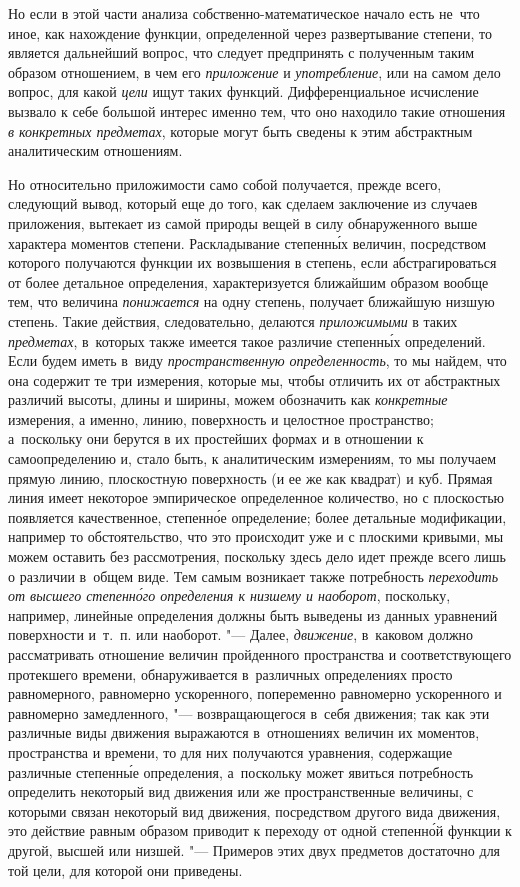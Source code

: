 Но если в этой части анализа собственно-математическое начало есть не~что иное,
как нахождение функции, определенной через развертывание степени, то является
дальнейший вопрос, что следует предпринять с полученным таким образом
отношением, в чем его {\em приложение} и {\em употребление}, или на самом дело
вопрос, для какой {\em цели} ищут таких функций. Дифференциальное исчисление
вызвало к себе большой интерес именно тем, что оно находило такие отношения
{\em в конкретных предметах}, которые могут быть сведены к этим абстрактным
аналитическим отношениям.

Но относительно приложимости само собой получается, прежде всего, следующий
вывод, который еще до того, как сделаем заключение из случаев приложения,
вытекает из самой природы вещей в силу обнаруженного выше характера моментов
степени. Раскладывание степенн\'{ы}х величин, посредством которого получаются
функции их возвышения в степень, если абстрагироваться от более детальное
определения, характеризуется ближайшим образом вообще тем, что величина
{\em понижается} на одну степень, получает ближайшую низшую степень. Такие
действия, следовательно, делаются {\em приложимыми} в таких {\em предметах},
в~которых также имеется такое различие степенн\'{ы}х определений. Если будем
иметь в~виду {\em пространственную определенность}, то мы найдем, что она
содержит те три измерения, которые мы, чтобы отличить их от абстрактных
различий высоты, длины и ширины, можем обозначить как {\em конкретные}
измерения, а именно, линию, поверхность и целостное пространство; а~поскольку
они берутся в их простейших формах и в отношении к самоопределению и, стало
быть, к аналитическим измерениям, то мы получаем прямую линию, плоскостную
поверхность (и ее же как квадрат) и куб. Прямая линия имеет некоторое
эмпирическое определенное количество, но с плоскостью появляется качественное,
степенн\'{о}е определение; более детальные модификации, например то
обстоятельство, что это происходит уже и с плоскими кривыми, мы можем оставить
без рассмотрения, поскольку здесь дело идет прежде всего лишь о различии
в~общем виде. Тем самым возникает также потребность {\em переходить от высшего
степенн\'{о}го определения к низшему и наоборот}, поскольку, например, линейные
определения должны быть выведены из данных уравнений поверхности и~т.~п. или
наоборот. "--- Далее, {\em движение}, в~каковом должно рассматривать отношение
величин пройденного пространства и соответствующего протекшего времени,
обнаруживается в~различных определениях просто равномерного, равномерно
ускоренного, попеременно равномерно ускоренного и равномерно замедленного, "---
возвращающегося в~себя движения; так как эти различные виды движения выражаются
в~отношениях величин их моментов, пространства и времени, то для них получаются
уравнения, содержащие различные степенн\'{ы}е определения, а~поскольку может
явиться потребность определить некоторый вид движения или же пространственные
величины, с которыми связан некоторый вид движения, посредством другого вида
движения, это действие равным образом приводит к переходу от одной
степенн\'{о}й функции к другой, высшей или низшей. "--- Примеров этих двух
предметов достаточно для той цели, для которой они приведены.

